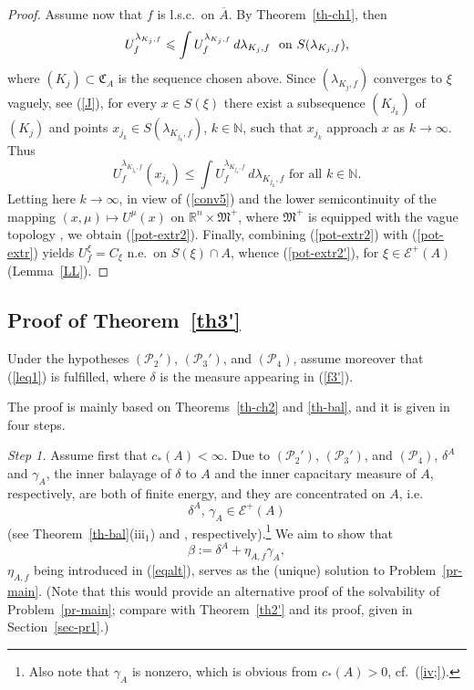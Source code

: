 \documentclass[12pt,a4paper,reqno]{amsart} %
\theoremstyle{lause}
\theoremstyle{maaritelma}
\theoremstyle{lause}
\theoremstyle{maaritelma}
\numberwithin{equation}{section}
\begin{document}
\begin{proof}
Assume now that $f$ is l.s.c.\ on $\overline{A}$. By Theorem~\ref{th-ch1}, then
\[U_f^{\lambda_{K_j,f}}\leqslant\int U^{\lambda_{K_j,f}}_f\,d\lambda_{K_j,f}\text{ \ on\/ $S(\lambda_{K_j,f})$},\]
where $(K_j)\subset\mathfrak C_A$ is the sequence chosen above. Since $(\lambda_{K_j,f})$ converges to $\xi$ vaguely, see (\ref{J}), for every $x\in S(\xi)$ there exist a subsequence $(K_{j_k})$ of $(K_j)$ and points $x_{j_k}\in S(\lambda_{K_{j_k},f})$, $k\in\mathbb N$, such that $x_{j_k}$ approach $x$ as $k\to\infty$. Thus
\[U_f^{\lambda_{K_{j_k},f}}(x_{j_k})\leqslant\int U^{\lambda_{K_{j_k},f}}_f\,d\lambda_{K_{j_k},f}\text{ \ for all $k\in\mathbb N$}.\]
Letting here $k\to\infty$, in view of (\ref{conv5}) and the lower semicontinuity of the mapping $(x,\mu)\mapsto U^\mu(x)$ on $\mathbb R^n\times\mathfrak M^+$, where $\mathfrak M^+$ is equipped with the vague topology \cite[Lemma~2.2.1(b)]{F1}, we obtain (\ref{pot-extr2}). Finally, combining (\ref{pot-extr2}) with (\ref{pot-extr}) yields $U_f^\xi=C_\xi$ n.e.\ on $S(\xi)\cap A$, whence (\ref{pot-extr2'}), for $\xi\in\mathcal E^+(A)$ (Lemma~\ref{LL}).
\end{proof}

\subsection{Proof of Theorem~\ref{th3'}}\label{sec-pr3} Under the hypotheses $(\mathcal P_2')$, $(\mathcal P_3')$, and $(\mathcal P_4)$, assume moreover that (\ref{leq1}) is fulfilled, where $\delta$ is the measure appearing in (\ref{f3'}).

The proof is mainly based on Theorems~\ref{th-ch2} and \ref{th-bal}, and it is given in four steps.\smallskip

{\it Step 1.} Assume first that $c_*(A)<\infty$. Due to $(\mathcal P_2')$, $(\mathcal P_3')$, and $(\mathcal P_4)$, $\delta^A$ and $\gamma_A$, the inner balayage of $\delta$ to $A$ and the inner capacitary measure of $A$, respectively, are both of finite energy, and they are concentrated on $A$, i.e.
\begin{equation}\label{zk}\delta^A,\,\gamma_A\in\mathcal E^+(A)\end{equation}
(see Theorem~\ref{th-bal}(iii$_1$) and \cite[Theorem~7.2]{Z-arx-22}, respectively).\footnote{Also note that $\gamma_A$ is nonzero, which is obvious from $c_*(A)>0$, cf.\ (\ref{iv;}).} We aim to show that
\begin{equation}\label{lk}
\beta:=\delta^A+\eta_{A,f}\gamma_A,
\end{equation}
$\eta_{A,f}$ being introduced in (\ref{eqalt}),
serves as the (unique) solution to Problem~\ref{pr-main}. (Note that this would provide an alternative proof of the solvability of Problem~\ref{pr-main}; compare with Theorem~\ref{th2'} and its proof, given in Section~\ref{sec-pr1}.)
\end{document}
